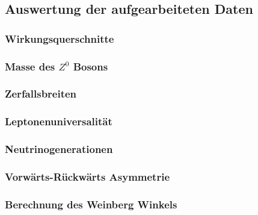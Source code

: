 \subsection{Auswertung der aufgearbeiteten Daten}
\begin{frame}
	\frametitle{Wirkungsquerschnitte}

\end{frame}
\begin{frame}
	\frametitle{Masse des $Z^0$ Bosons}
	
\end{frame}
\begin{frame}
	\frametitle{Zerfallsbreiten}
	
\end{frame}
\begin{frame}
	\frametitle{Leptonenuniversalität}
	
\end{frame}
\begin{frame}
	\frametitle{Neutrinogenerationen}
	
\end{frame}
\begin{frame}
	\frametitle{Vorwärts-Rückwärts Asymmetrie}
	
\end{frame}
\begin{frame}
	\frametitle{Berechnung des Weinberg Winkels}
	
\end{frame}





